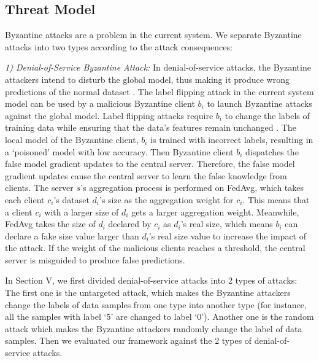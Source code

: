 \documentclass[journal]{IEEEtran}
\begin{document}
\subsection{Threat Model}
Byzantine attacks are a problem in the current system. We separate Byzantine attacks into two types according to the attack consequences:
\par \textit{1) Denial-of-Service Byzantine Attack:} In denial-of-service attacks, the Byzantine attackers intend to disturb the global model, thus making it produce wrong predictions of the normal dataset \cite{ref_04_model,ref_06_model,ref_07_data,yang2017generative,sun2018data}. The label flipping attack in the current system model can be used by a malicious Byzantine client $b_i$ to launch Byzantine attacks against the global model. Label flipping attacks require $b_i$ to change the labels of training data while ensuring that the data's features remain unchanged \cite{ref_18_label_flipping}. The local model of the Byzantine client, $b_i$ is trained with incorrect labels, resulting in a `poisoned' model with low accuracy. Then Byzantine client $b_{i}$ dispatches the false model gradient updates to the central server. Therefore, the false model gradient updates cause the central server to learn the false knowledge from clients. The server $s$'s aggregation process is performed on FedAvg, which takes each client $c_{i}$'s dataset $d_{i}$'s size as the aggregation weight for $c_{i}$. This means that a client $c_{i}$ with a larger size of $d_{i}$ gets a larger aggregation weight. Meanwhile, FedAvg takes the size of $d_{i}$ declared by $c_{i}$ as $d_{i}$'s real size, which means $b_{i}$ can declare a fake size value larger than $d_{i}$'s real size value to increase the impact of the attack. If the weight of the malicious clients reaches a threshold, the central server is misguided to produce false predictions. 
\par In Section V, we first divided denial-of-service attacks into 2 types of attacks: The first one is the untargeted attack, which makes the Byzantine attackers change the labels of data samples from one type into another type (for instance, all the samples with label `5' are changed to label `0'). Another one is the random attack which makes the Byzantine attackers randomly change the label of data samples. Then we evaluated our framework against the 2 types of denial-of-service attacks.
\end{document}
